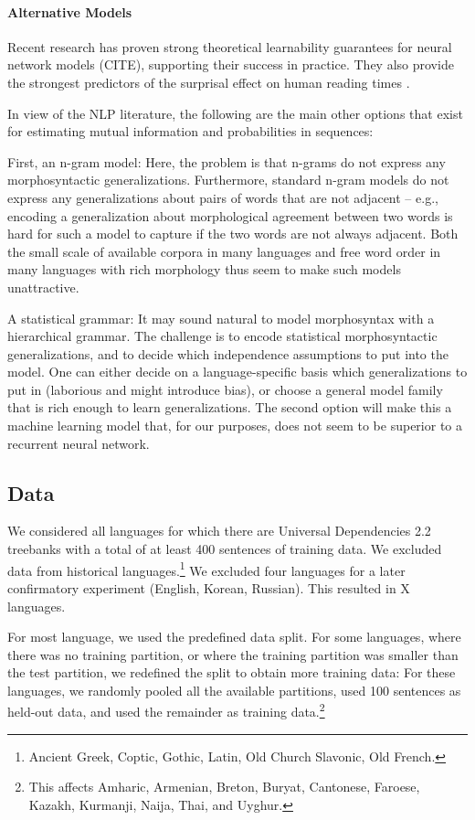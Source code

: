 \documentclass[11pt,letterpaper]{article}
\begin{document}
\paragraph{Alternative Models}
Recent research has proven strong theoretical learnability guarantees for neural network models (CITE), supporting their success in practice.
They also provide the strongest predictors of the surprisal effect on human reading times \citep{frank-insensitivity-2011, goodkind-predictive-2018}.

In view of the NLP literature, the following are the main other options that exist for estimating mutual information and probabilities in sequences:

First, an n-gram model: Here, the problem is that n-grams do not express any morphosyntactic generalizations. Furthermore, standard n-gram models do not express any generalizations about pairs of words that are not adjacent -- e.g., encoding a generalization about morphological agreement between two words is hard for such a model to capture if the two words are not always adjacent. Both the small scale of available corpora in many languages and free word order in many languages with rich morphology thus seem to make such models unattractive.

A statistical grammar: It may sound natural to model morphosyntax with a hierarchical grammar. The challenge is to encode statistical morphosyntactic generalizations, and to decide which independence assumptions to put into the model. One can either decide on a language-specific basis which generalizations to put in (laborious and might introduce bias), or choose a general model family that is rich enough to learn generalizations. The second option will make this a machine learning model that, for our purposes, does not seem to be superior to a recurrent neural network.




\subsection{Data}
We considered all languages for which there are Universal Dependencies 2.2 treebanks with a total of at least 400 sentences of training data.
We excluded data from historical languages.\footnote{Ancient Greek, Coptic, Gothic, Latin, Old Church Slavonic, Old French.}
We excluded four languages for a later confirmatory experiment (English, Korean, Russian). %
This resulted in X languages.

For most language, we used the predefined data split.
For some languages, where there was no training partition, or where the training partition was smaller than the test partition, we redefined the split to obtain more training data:
For these languages, we randomly pooled all the available partitions, used 100 sentences as held-out data, and used the remainder as training data.\footnote{This affects Amharic, Armenian, Breton, Buryat, Cantonese, Faroese, Kazakh, Kurmanji, Naija, Thai, and Uyghur.}
\end{document}
